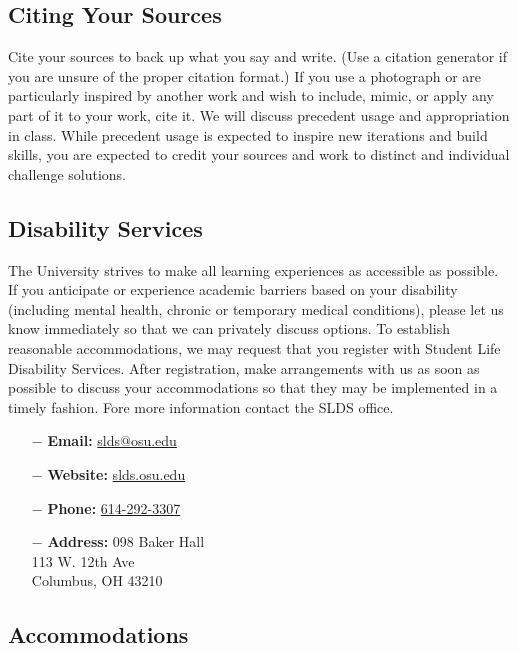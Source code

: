 \documentclass[12pt,letter,english]{report}
\providecommand{\tightlist}{%
      \setlength{\itemsep}{0pt}\setlength{\parskip}{0pt}%
}
\begin{document}
\subsection{Citing Your Sources}

Cite your sources to back up what you say and write. (Use a citation generator if you are unsure of the proper citation format.) If you use a photograph or are particularly inspired by another work and wish to include, mimic, or apply any part of it to your work, cite it. We will discuss precedent usage and appropriation in class. While precedent usage is expected to inspire new iterations and build skills, you are expected to credit your sources and work to distinct and individual challenge solutions.

\subsection{Disability Services}

The University strives to make all learning experiences as accessible as possible. If you anticipate or experience academic barriers based on your disability (including mental health, chronic or temporary medical conditions), please let us know immediately so that we can privately discuss options. To establish reasonable accommodations, we may request that you register with Student Life Disability Services. After registration, make arrangements with us as soon as possible to discuss your accommodations so that they may be implemented in a timely fashion. Fore more information contact the SLDS office.

\begin{itemize}
      \tightlist
      \item[$-$] \textbf{Email:} \href{mailto:slds@osu.edu}{slds@osu.edu}
      \item[$-$] \textbf{Website:} \href{http://www.ods.ohio-state.edu/}{slds.osu.edu}
      \item[$-$] \textbf{Phone:} \href{tel:6142923307}{614-292-3307}
      \item[$-$] \textbf{Address:} 098 Baker Hall\\%
            \hspace*{4.8em}113 W. 12th Ave\\%
            \hspace*{4.8em}Columbus, OH 43210
\end{itemize}




\subsection{Accommodations}
\end{document}
